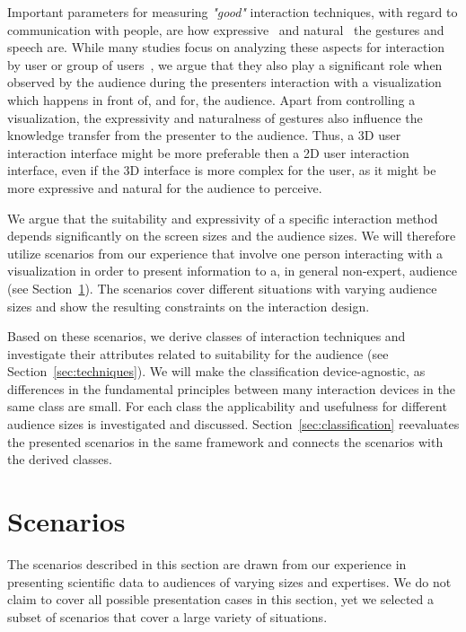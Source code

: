 \documentclass[journal]{vgtc}                %
\begin{document}
Important parameters for measuring \emph{"good"} interaction techniques, with regard to communication with people, are how expressive~\cite{Brewster:2009:MIE:2227763.2227769} and natural~\cite{O'hara:2013:NTP:2442106.2442111} the gestures and speech are.
While many studies focus on analyzing these aspects for interaction by user or group of users~\cite{978-3-642-12552-2, Caridakis:2013:NIE:2504335.2504378}, we argue that they also play a significant role when observed by the audience during the presenters interaction with a visualization which happens in front of, and for, the audience.
Apart from controlling a visualization, the expressivity and naturalness of gestures also influence the knowledge transfer from the presenter to the audience. Thus, a 3D user interaction interface might be more preferable then a 2D user interaction interface, even if the 3D interface is more complex for the user, as it might be more expressive and natural for the audience to perceive.

We argue that the suitability and expressivity of a specific interaction method depends significantly on the screen sizes and the audience sizes.
We will therefore utilize scenarios from our experience that involve one person interacting with a visualization in order to present information to a, in general non-expert, audience (see Section~\ref{sec:scenario}).
The scenarios cover different situations with varying audience sizes and show the resulting constraints on the interaction design.

Based on these scenarios, we derive classes of interaction techniques and investigate their attributes related to suitability for the audience (see Section~\ref{sec:techniques}).
We will make the classification device-agnostic, as differences in the fundamental principles between many interaction devices in the same class are small.
For each class the applicability and usefulness for different audience sizes is investigated and discussed.
Section~\ref{sec:classification} reevaluates the presented scenarios in the same framework and connects the scenarios with the derived classes.

%
%
%
\section{Scenarios} \label{sec:scenario}
The scenarios described in this section are drawn from our experience in presenting scientific data to audiences of varying sizes and expertises.
We do not claim to cover all possible presentation cases in this section, yet we selected a subset of scenarios that cover a large variety of situations.
\end{document}
